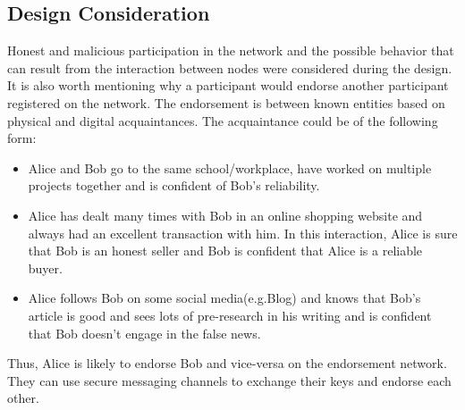 %

\subsection{Design Consideration}
Honest and malicious participation in the network and the possible behavior
that can result from the interaction between nodes were considered during the
design. It is also worth mentioning why a participant would endorse another
participant registered on the network. The endorsement is between known
entities based on physical and digital acquaintances. 
The acquaintance could be of the following form:
\begin{itemize}
	\item Alice and Bob go to the same school/workplace, have worked on
		multiple projects together and is confident of Bob's reliability.
	\item Alice has dealt many times with Bob in an online shopping website and
		always had an excellent transaction with him. In this interaction,
		Alice is sure that Bob is an honest seller and Bob is confident that
		Alice is a reliable buyer. 
	\item Alice follows Bob on some social media(e.g.Blog) and knows that Bob's
		article is good and sees lots of pre-research in his writing and is
		confident that Bob doesn't engage in the false news.
\end{itemize}
Thus, Alice is likely to endorse Bob and vice-versa on the endorsement network.
They can use secure messaging channels to exchange their keys and endorse each
other. \\

